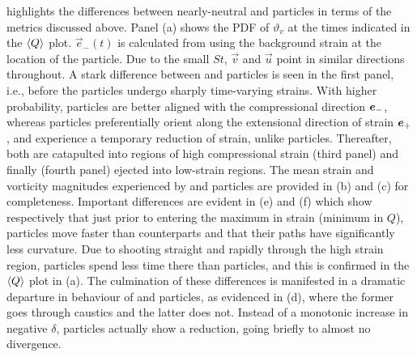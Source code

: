 \documentclass[../Rajarshi-thesis-draft.tex]{subfiles}
\begin{document}
 highlights the differences between nearly-neutral \cs and \su particles in terms of the metrics discussed above. Panel (a) shows the PDF of $\vartheta_v$ at the times indicated in the $\langle Q\rangle$ plot. $\vec{e}_-(t)$ is calculated from  using the background strain at the location of the particle.
Due to the small $St$, $\vec{v}$ and $\vec{u}$ point in similar directions throughout.
A stark difference between \cs and \su particles is seen in the first panel, i.e., before the particles undergo sharply time-varying strains. With higher probability, \cs particles are better aligned with the compressional direction $\boldsymbol{e}_{-}$, whereas \su particles preferentially orient along the extensional direction of strain $\boldsymbol{e}_+$, and experience a temporary reduction of strain, unlike \cs particles. Thereafter, both are catapulted into regions of high compressional strain (third panel) and finally (fourth panel) ejected into low-strain regions. The mean strain and vorticity magnitudes experienced by \cs and \su particles are provided in  (b) and (c) for completeness. Important differences are evident in  (e) and (f) which show respectively that just prior to entering the maximum in strain (minimum in $Q$), \su particles move faster than \cs counterparts and that their paths have significantly less curvature. Due to shooting straight and rapidly through the high strain region, \su particles spend less time there than \cs particles, and this is confirmed in the $\langle Q\rangle$ plot in (a). The culmination of these differences is manifested in a dramatic departure in behaviour of \cs and \su particles, as evidenced in  (d), where the former goes through caustics and the latter does not. Instead of a monotonic increase in negative $\delta$, \su particles actually show a reduction, going briefly to almost no divergence.
\end{document}
